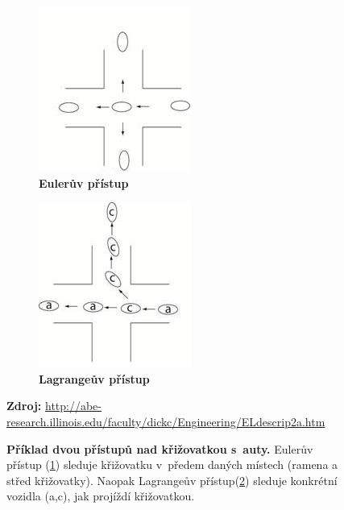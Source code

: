 \begin{figure}[h]
\centering
\begin{subfigure}{.5\textwidth}
  	\centering
	\includegraphics[width=0.7\linewidth]{obrazky-figures/EulerLagran_02.jpg}
	\caption{\textbf{Eulerův přístup}}
	\label{fig:Euler}
\end{subfigure}%
\begin{subfigure}{.5\textwidth}
  	\centering
	\includegraphics[width=0.7\linewidth]{obrazky-figures/EulerLagran_01.jpg}
	\caption{\textbf{Lagrangeův přístup}}
	\label{fig:Lagran}
\end{subfigure}
\caption{\textbf{Příklad dvou přístupů nad křižovatkou s~auty.} Eulerův přístup (\ref{fig:Euler}) sleduje křižovatku v~předem daných místech (ramena a střed křižovatky). Naopak Lagrangeův přístup(\ref{fig:Lagran}) sleduje konkrétní vozidla (a,c), jak projíždí křižovatkou.}
\textbf{Zdroj:} \url{http://abe-research.illinois.edu/faculty/dickc/Engineering/ELdescrip2a.htm}
\label{fig:ztencovani}
\end{figure}

